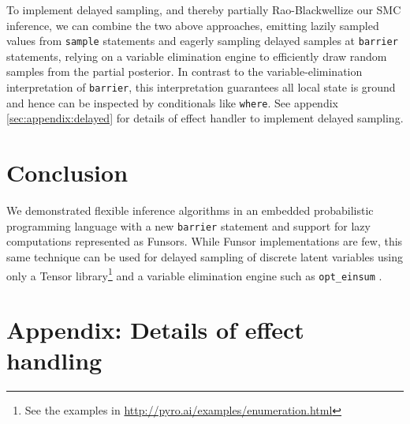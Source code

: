 \documentclass[anonymous=false, %
               format=acmsmall, %
               review=true, %
               screen=true, %
               nonacm=true]{acmart}
\begin{document}
To implement delayed sampling, and thereby partially Rao-Blackwellize our SMC inference, we can combine the two above approaches, emitting lazily sampled values from \verb$sample$ statements and eagerly sampling delayed samples at \verb$barrier$ statements, relying on a variable elimination engine to efficiently draw random samples from the partial posterior.
In contrast to the variable-elimination interpretation of \verb$barrier$, this interpretation guarantees all local state is ground and hence can be inspected by conditionals like \verb$where$.
See appendix \ref{sec:appendix:delayed} for details of effect handler to implement delayed sampling.

\section{Conclusion}

We demonstrated flexible inference algorithms in an embedded probabilistic programming language with a new \verb$barrier$ statement and support for lazy computations represented as Funsors.
While Funsor implementations are few, this same technique can be used for delayed sampling of discrete latent variables using only a Tensor library\footnote{See the examples in \url{http://pyro.ai/examples/enumeration.html}} and a variable elimination engine such as \verb$opt_einsum$ \cite{smith2018opt_einsum}.





\section{Appendix: Details of effect handling}
\end{document}
